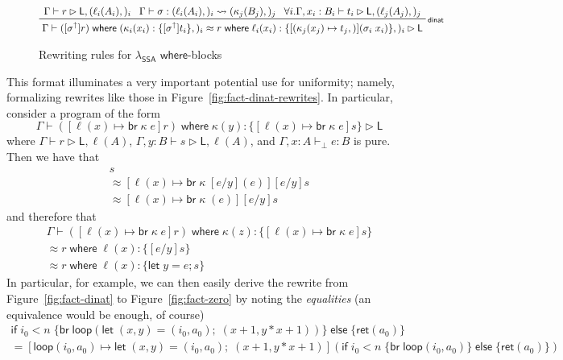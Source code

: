 \documentclass[acmsmall,screen,review]{acmart}
\newcommand{\ms}[1]{\ensuremath{\mathsf{#1}}}
\newcommand{\lto}{:}
\newcommand{\letexpr}[3]{\ensuremath{\ms{let}\;#1 = #2;\;#3}}
\newcommand{\letstmt}[3]{\ensuremath{\ms{let}\;#1 = #2; #3}}
\newcommand{\brb}[2]{\ms{br}\;#1\;#2}
\newcommand{\where}[2]{#1\;\ms{where}\;#2}
\newcommand{\wbranch}[3]{#1(#2) \lto \{#3\}}
\newcommand{\upg}[1]{{#1}^\uparrow}
\newcommand{\bhyp}[2]{#1 : #2}
\newcommand{\lhyp}[2]{#1(#2)}
\newcommand{\rle}[1]{{\scriptsize\textsf{#1}}}
\newcommand{\hasty}[4]{#1 \vdash_{#2} #3: {#4}}
\newcommand{\haslb}[3]{#1 \vdash #2 \rhd #3}
\newcommand{\lbsubst}[4]{#1 \vdash #2: #3 \rightsquigarrow #4}
\newcommand{\teqv}{\approx}
\newcommand{\lbeq}[4]{#1 \vdash #2 \teqv #3 \rhd {#4}}
\newcommand{\isotopessa}{\(\lambda_{\ms{SSA}}\)}
\begin{document}
\begin{figure}
\begin{gather*}
      \prftree[r]{\rle{dinat}}
        {
          \haslb{\Gamma}{r}{\ms{L}, (\lhyp{\ell_i}{A_i},)_i}
        }{
          \lbsubst{\Gamma}{\sigma}{(\lhyp{\ell_i}{A_i},)_i}{(\lhyp{\kappa_j}{B_j},)_j}
        }{
          \forall i. \haslb{\Gamma, \bhyp{x_i}{B_i}}{t_i}{\ms{L}, (\lhyp{\ell_j}{A_j},)_j}
        }{
          \lbeq{\Gamma}
            {\where{([\upg{\sigma}]r)}{(\wbranch{\kappa_i}{x_i}{[\upg{\sigma}]t_i},)_i}}
            {\where{r}{\wbranch{\ell_i}{x_i}{[(\kappa_j(x_j) \mapsto t_j,)](\sigma_i\;x_i)},)_i}}
            {\ms{L}}
        }
  \end{gather*}
  \Description{}
  \caption{Rewriting rules for \isotopessa{} \ms{where}-blocks}
  \label{fig:ssa-where-rules}
\end{figure}

This format illuminates a very important potential use for uniformity; namely, formalizing rewrites
like those in Figure~\ref{fig:fact-dinat-rewrites}. In particular, consider a program of the form
\begin{equation*}
  \haslb{\Gamma}{\where{([\ell(x) \mapsto \brb{\kappa}{e}]r)}{
    \wbranch{\kappa}{y}{[\ell(x) \mapsto \brb{\kappa}{e}]s}
  }}{\ms{L}}
\end{equation*}
where $\haslb{\Gamma}{r}{\ms{L}, \ell(A)}$, $\haslb{\Gamma, y : B}{s}{\ms{L}, \ell(A)}$, and
$\hasty{\Gamma, \bhyp{x}{A}}{\bot}{e}{B}$ is pure. Then we have that
\begin{multline*}
  [e/y][\ell(x) \mapsto \brb{\kappa}{(e)}]s 
  \\ \teqv
  [\ell(x) \mapsto \brb{\kappa}{[e/y](e)}][e/y]s
  \\ \teqv
  [\ell(x) \mapsto \brb{\kappa}{(e)}][e/y]s
\end{multline*}
and therefore that
\begin{multline*}
  \Gamma \vdash \where{([\ell(x) \mapsto \brb{\kappa}{e}]r)}{
    \wbranch{\kappa}{z}{[\ell(x) \mapsto \brb{\kappa}{e}]s}} \\ \teqv
    \where{r}{
    \wbranch{\ell}{x}{[e/y]s}} \\ \teqv
    \where{r}{
    \wbranch{\ell}{x}{\letstmt{y}{e}{s}}} 
\end{multline*}
In particular, for example, we can then easily derive the rewrite from Figure~\ref{fig:fact-dinat}
to Figure~\ref{fig:fact-zero} by noting the \emph{equalities} (an equivalence would be enough, of
course)
\begin{multline*}
  \ms{if}\;i_0 < n\;\{
    \ms{br}\;\ms{loop}(
      \letexpr{(x, y)}{(i_0, a_0)}{(x + 1, y * x + 1)}
    )
  \}\;\ms{else}\;\{
    \ms{ret}(a_0)
  \} \\
  =
  [\ms{loop}(i_0, a_0) \mapsto \letexpr{(x, y)}{(i_0, a_0)}{(x + 1, y * x + 1)}](
    \ms{if}\;i_0 < n\;\{
      \ms{br}\;\ms{loop}(i_0, a_0)
    \}\;\ms{else}\;\{
      \ms{ret}(a_0)
    \}
  )
\end{multline*}
\end{document}
